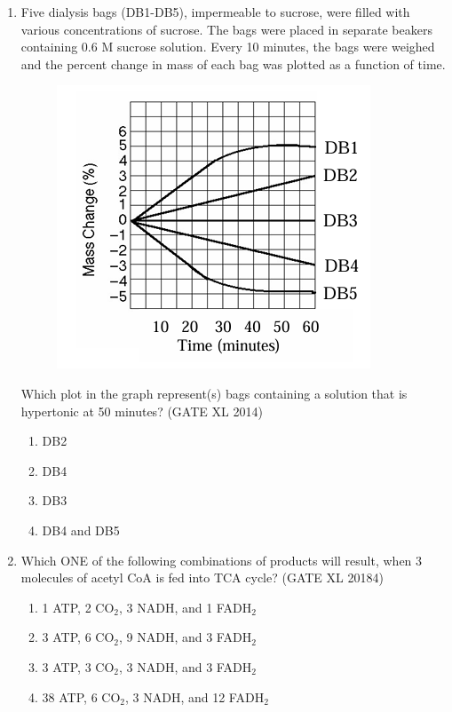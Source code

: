 \documentclass[journal,12pt,onecolumn]{IEEEtran}
\theoremstyle{remark}
\begin{document}
\begin{enumerate}
\item Five dialysis bags (DB1-DB5), impermeable to sucrose, were filled with various concentrations of sucrose. The bags were placed in separate beakers containing 0.6 M sucrose solution. Every 10 minutes, the bags were weighed and the percent change in mass of each bag was plotted as a function of time. \\
\begin{figure}[H]
    \centering
    \includegraphics[width=0.5\columnwidth]{fig37.png}
    \caption{}
    \label{fig:placeholder}
\end{figure}
Which plot in the graph represent(s) bags containing a solution that is hypertonic at 50 minutes? \hfill(GATE XL 2014)\\
\begin{multicols}{2}
\begin{enumerate}
\item DB2
\item DB4
\item DB3
\item DB4 and DB5
\end{enumerate}
\end{multicols}

\item Which ONE of the following combinations of products will result, when 3 molecules of acetyl CoA is fed into TCA cycle? \hfill(GATE XL 20184)\\
\begin{multicols}{2}
\begin{enumerate}
\item 1 ATP, 2 CO$_2$, 3 NADH, and 1 FADH$_2$
\item 3 ATP, 6 CO$_2$, 9 NADH, and 3 FADH$_2$
\item 3 ATP, 3 CO$_2$, 3 NADH, and 3 FADH$_2$
\item 38 ATP, 6 CO$_2$, 3 NADH, and 12 FADH$_2$
\end{enumerate}
\end{multicols}


\end{enumerate}
\end{document}
